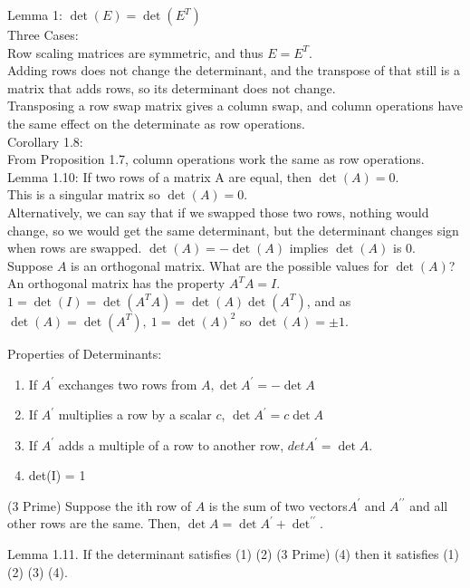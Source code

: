 \documentclass[12pt]{article}
\begin{document}
Lemma 1: $\det(E) = \det(E^T)$\\
Three Cases:\\
Row scaling matrices are symmetric, and thus $E=E^T$.\\
Adding rows does not change the determinant, and the transpose of that still is a matrix that adds rows, so its determinant does not change.\\
Transposing a row swap matrix gives a column swap, and column operations have the same effect on the determinate as row operations.\\

Corollary 1.8:\\
From Proposition 1.7, column operations work the same as row operations.\\

Lemma 1.10: If two rows of a matrix A are equal, then $\det(A) = 0$.\\
This is a singular matrix so $\det(A)=0$.\\
Alternatively, we can say that if we swapped those two rows, nothing would change, so we would get the same determinant, but the determinant changes sign when rows are swapped. $\det(A) = -\det(A)$ implies $\det(A)$ is 0.\\

Suppose $A$ is an orthogonal matrix. What are the possible values for $\det(A)$?\\
An orthogonal matrix has the property $A^T A = I$.\\
$1 = \det(I) = \det(A^T A) = \det(A) \det(A^T)$, and as $\det(A)=\det(A^T),~ 1=\det(A)^2$ so $\det(A) = \pm 1$.


Properties of Determinants:
\begin{enumerate}
\item If $A^\prime$ exchanges two rows from $A, \det A^\prime = -\det A$
\item If $A^\prime$ multiplies a row by a scalar $c$, $\det A^\prime = c \det A$
\item If $A^\prime$ adds a multiple of a row to another row, $det A^\prime = \det A$.
\item det(I) = 1
\end{enumerate}
(3 Prime) Suppose the ith row of $A$ is the sum of two vectors$A^\prime$ and $A^{\prime \prime}$ and all other rows are the same. Then, $\det A = \det A^\prime + \det^{\prime \prime}$.

Lemma 1.11. If the determinant satisfies (1) (2) (3 Prime) (4) then it satisfies (1) (2) (3) (4).\\
\end{document}
